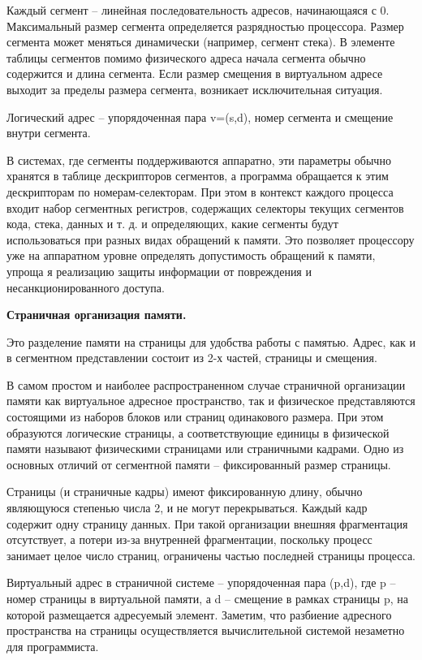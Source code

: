 Каждый сегмент – линейная последовательность адресов, начинающаяся с 0. Максимальный размер сегмента определяется разрядностью процессора. Размер сегмента может меняться динамически (например, сегмент стека). В элементе таблицы сегментов помимо физического адреса начала сегмента обычно содержится и длина сегмента. Если размер смещения в виртуальном адресе выходит за пределы размера сегмента, возникает исключительная ситуация.

Логический адрес – упорядоченная пара v=(s,d), номер сегмента и смещение внутри сегмента.

В системах, где сегменты поддерживаются аппаратно, эти параметры обычно хранятся в таблице дескрипторов сегментов, а программа обращается к этим дескрипторам по номерам-селекторам. При этом в контекст каждого процесса входит набор сегментных регистров, содержащих селекторы текущих сегментов кода, стека, данных и т. д. и определяющих, какие сегменты будут использоваться при разных видах обращений к памяти. Это позволяет процессору уже на аппаратном уровне определять допустимость обращений к памяти, упроща я реализацию защиты информации от повреждения и несанкционированного доступа.

\begin{center}{\bfseries Страничная организация памяти.}
\end{center}

\begin{opr}
  Это разделение памяти на страницы для удобства работы с памятью. Адрес, как и в сегментном представлении состоит из 2-х частей, страницы и смещения.
\end{opr}

В самом простом и наиболее распространенном случае страничной организации памяти как виртуальное адресное пространство, так и физическое представляются состоящими из наборов блоков или страниц одинакового размера. При этом образуются логические страницы, а соответствующие единицы в физической памяти называют физическими страницами или страничными кадрами. Одно из основных отличий от сегментной памяти – фиксированный размер страницы.

Страницы (и страничные кадры) имеют фиксированную длину, обычно являющуюся степенью числа 2, и не могут перекрываться. Каждый кадр содержит одну страницу данных. При такой организации внешняя фрагментация отсутствует, а потери из-за внутренней фрагментации, поскольку процесс занимает целое число страниц, ограничены частью последней страницы процесса.

Виртуальный адрес в страничной системе – упорядоченная пара (p,d), где p – номер страницы в виртуальной памяти, а d – смещение в рамках страницы p, на которой размещается адресуемый элемент. Заметим, что разбиение адресного пространства на страницы осуществляется вычислительной системой незаметно для программиста.

